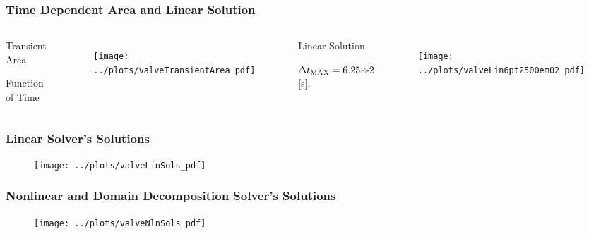\documentclass[compress,xcolor=table]{beamer}
\newlength{\hpw}
\begin{document}
\begin{frame}
\frametitle{Time Dependent Area and Linear Solution}

\begin{columns}

\column{\hpw}
\begin{center}
Transient Area

Function of Time
\end{center}
\begin{figure}[h!t]
\centering
\texttt{[image: ../plots/valveTransientArea\_pdf]}
\end{figure}

\column{\hpw}
\begin{center}
Linear Solution

$\dtmax{}=\expneg{6.25}{2}$ [s].
\end{center}
\begin{figure}[h!t]
\centering
\texttt{[image: ../plots/valveLin6pt2500em02\_pdf]}
\end{figure}


\end{columns}


\end{frame}
\begin{frame}
\frametitle{Linear Solver's Solutions}

\begin{figure}[h!t]
\centering
\texttt{[image: ../plots/valveLinSols\_pdf]}
\end{figure}


\end{frame}
\begin{frame}
\frametitle{Nonlinear and Domain Decomposition Solver's Solutions}

\begin{figure}[h!t]
\centering
\texttt{[image: ../plots/valveNlnSols\_pdf]}
\end{figure}



\end{frame}
\end{document}
